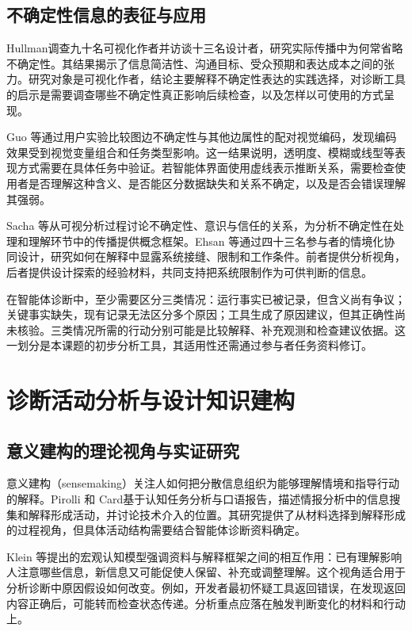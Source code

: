 \subsection{不确定性信息的表征与应用}

Hullman\cite{ref40}调查九十名可视化作者并访谈十三名设计者，研究实际传播中为何常省略不确定性。其结果揭示了信息简洁性、沟通目标、受众预期和表达成本之间的张力。研究对象是可视化作者，结论主要解释不确定性表达的实践选择，对诊断工具的启示是需要调查哪些不确定性真正影响后续检查，以及怎样以可使用的方式呈现。

Guo 等\cite{ref62}通过用户实验比较图边不确定性与其他边属性的配对视觉编码，发现编码效果受到视觉变量组合和任务类型影响。这一结果说明，透明度、模糊或线型等表现方式需要在具体任务中验证。若智能体界面使用虚线表示推断关系，需要检查使用者是否理解这种含义、是否能区分数据缺失和关系不确定，以及是否会错误理解其强弱。

Sacha 等\cite{ref39}从可视分析过程讨论不确定性、意识与信任的关系，为分析不确定性在处理和理解环节中的传播提供概念框架。Ehsan 等\cite{ref54}通过四十三名参与者的情境化协同设计，研究如何在解释中显露系统接缝、限制和工作条件。前者提供分析视角，后者提供设计探索的经验材料，共同支持把系统限制作为可供判断的信息。

在智能体诊断中，至少需要区分三类情况：运行事实已被记录，但含义尚有争议；关键事实缺失，现有记录无法区分多个原因；工具生成了原因建议，但其正确性尚未核验。三类情况所需的行动分别可能是比较解释、补充观测和检查建议依据。这一划分是本课题的初步分析工具，其适用性还需通过参与者任务资料修订。

\section{诊断活动分析与设计知识建构}

\subsection{意义建构的理论视角与实证研究}

意义建构（sensemaking）关注人如何把分散信息组织为能够理解情境和指导行动的解释。Pirolli 和 Card\cite{ref17}基于认知任务分析与口语报告，描述情报分析中的信息搜集和解释形成活动，并讨论技术介入的位置。其研究提供了从材料选择到解释形成的过程视角，但具体活动结构需要结合智能体诊断资料确定。

Klein 等\cite{ref11}提出的宏观认知模型强调资料与解释框架之间的相互作用：已有理解影响人注意哪些信息，新信息又可能促使人保留、补充或调整理解。这个视角适合用于分析诊断中原因假设如何改变。例如，开发者最初怀疑工具返回错误，在发现返回内容正确后，可能转而检查状态传递。分析重点应落在触发判断变化的材料和行动上。

